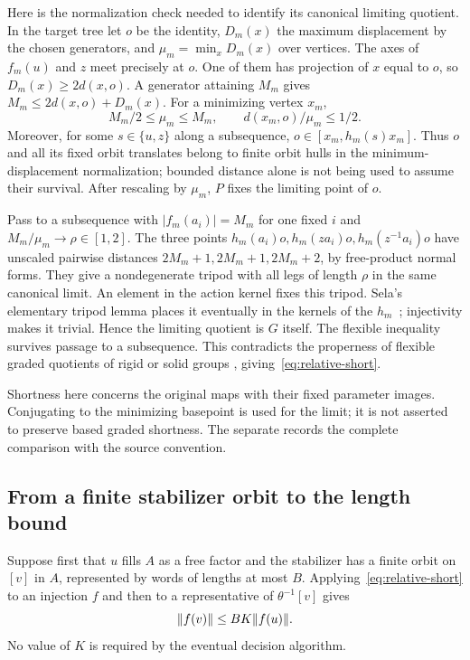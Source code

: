 Here is the normalization check needed to identify its canonical
limiting quotient. In the target tree let $o$ be the identity,
$D_m(x)$ the maximum displacement by the chosen generators, and
$\mu_m=\min_xD_m(x)$ over vertices. The axes of $f_m(u)$ and $z$
meet precisely at $o$. One of them has projection of $x$ equal to
$o$, so $D_m(x)\ge2d(x,o)$. A generator attaining $M_m$ gives
$M_m\le2d(x,o)+D_m(x)$. For a minimizing vertex $x_m$,
\begin{equation}\label{eq:minimum-compare}
 M_m/2\le\mu_m\le M_m,\qquad d(x_m,o)/\mu_m\le1/2.
\end{equation}
Moreover, for some $s\in\{u,z\}$ along a subsequence,
$o\in[x_m,h_m(s)x_m]$. Thus $o$ and all its fixed orbit translates
belong to finite orbit hulls in the minimum-displacement normalization;
bounded distance alone is not being used to assume their survival.
After rescaling by $\mu_m$, $P$ fixes the limiting point of $o$.

Pass to a subsequence with $|f_m(a_i)|=M_m$ for one fixed $i$ and
$M_m/\mu_m\to\rho\in[1,2]$. The three points
$h_m(a_i)o,h_m(za_i)o,h_m(z^{-1}a_i)o$ have unscaled pairwise
distances $2M_m+1,2M_m+1,2M_m+2$, by free-product normal forms.
They give a nondegenerate tripod with all legs of length $\rho$ in
the same canonical limit. An element in the action kernel fixes this
tripod. Sela's elementary tripod lemma places it eventually in the
kernels of the $h_m$~\cite[Lemma 1.3(iii)]{sela}; injectivity makes
it trivial. Hence the limiting quotient is $G$ itself. The flexible
inequality survives passage to a subsequence. This contradicts the
properness of flexible graded quotients of rigid or solid groups
\cite[Lemma 10.4(ii)]{sela}, giving~\eqref{eq:relative-short}.

Shortness here concerns the original maps with their fixed parameter
images. Conjugating to the minimizing basepoint is used for the limit;
it is not asserted to preserve based graded shortness. The separate
records the complete comparison with the source convention.

\subsection{From a finite stabilizer orbit to the length bound}
Suppose first that $u$ fills $A$ as a free factor and the stabilizer
has a finite orbit on $[v]$ in $A$, represented by words of lengths
at most $B$. Applying~\eqref{eq:relative-short} to an injection $f$
and then to a representative of $\theta^{-1}[v]$ gives
\[
 \lVert f(v)\rVert\le BK\lVert f(u)\rVert.
\]
No value of $K$ is required by the eventual decision algorithm.

